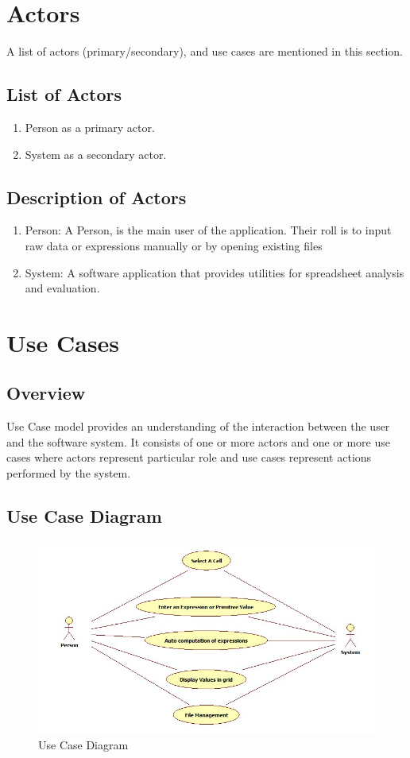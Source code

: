 \documentclass[12pt]{article}
\begin{document}
\section{Actors}
A list of actors (primary/secondary), and use cases are mentioned in this section.

\subsection{List of Actors}
\begin{enumerate}
\item Person as a primary actor.
\item System as a secondary actor.
\end{enumerate}

\subsection{Description of Actors}
\begin{enumerate}
\item Person:  A Person, is the main user of the application. Their roll is to input raw data or expressions manually or by opening existing files
\item System:  A software application that provides utilities for spreadsheet analysis and evaluation.
\end{enumerate}

\section{Use Cases}

\subsection{Overview}
Use Case model provides an understanding of the interaction between the user and the software
system. It consists of one or more actors and one or more use cases where actors represent particular
role and use cases represent actions performed by the system. 
\clearpage
\subsection{Use Case Diagram}
\begin{figure}[htbp]
\includegraphics[scale=0.7]{USE_CASE_DIAGRAM.jpg}
\caption{Use Case Diagram}
\label{fig:use-case-diagram}
\end{figure}
\end{document}
